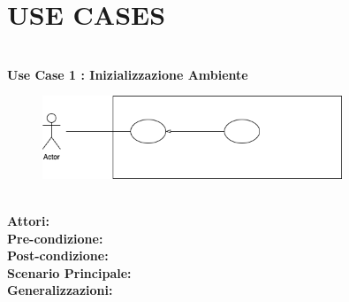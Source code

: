 \section{USE CASES}
\Large\textbf{}\\
\Large\textbf{Use Case 1 : Inizializzazione Ambiente} \\
\vspace{0.5cm}
\begin{figure}[h]
  \centering
  \includegraphics[width=0.8\textwidth]{UseCasesImages/UC1.png}
\end{figure}

\large\textbf{} \\
\textbf{Attori:} \\
\textbf{Pre-condizione:} \\
\textbf{Post-condizione:} \\
\textbf{Scenario Principale:} \\
\textbf{Generalizzazioni:} \\

\vspace{0.5cm}




